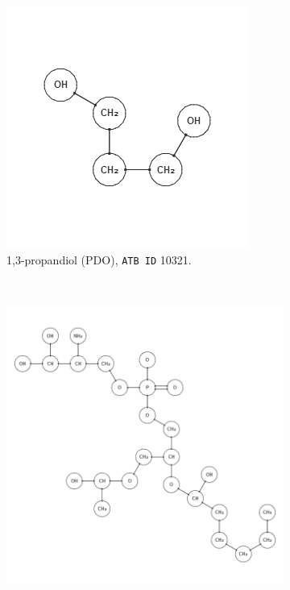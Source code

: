 \begin{figure}[h!]
\centering
\begin{subfigure}[t]{0.48\textwidth}
\centering
\includegraphics[width=\textwidth]{img/10321.png}
\caption{1,3-propandiol (PDO), \texttt{ATB ID} 10321.}
\end{subfigure}%
~
\begin{subfigure}[t]{0.48\textwidth}
\centering
\includegraphics[width=\textwidth]{img/16978.png}

\end{subfigure}
\end{figure}
